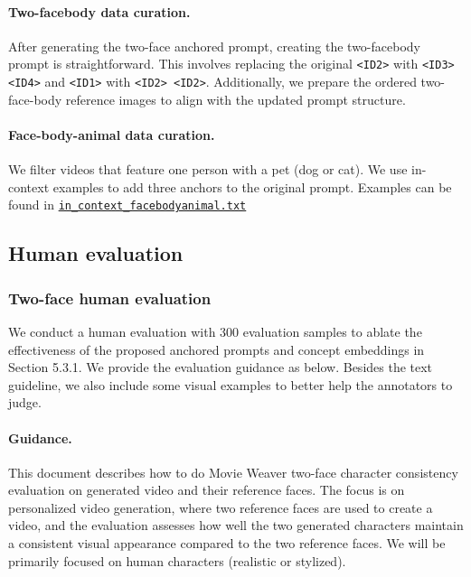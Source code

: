 \paragraph{Two-facebody data curation.}
After generating the two-face anchored prompt, creating the two-facebody prompt is straightforward. This involves replacing the original \texttt{\textless{}ID2\textgreater{}} with \texttt{\textless{}ID3\textgreater{} \textless{}ID4\textgreater{}} and \texttt{\textless{}ID1\textgreater{}} with \texttt{\textless{}ID2\textgreater{} \textless{}ID2\textgreater{}}. Additionally, we prepare the ordered two-face-body reference images to align with the updated prompt structure.

\paragraph{Face-body-animal data curation.}
We filter videos that feature one person with a pet (dog or cat). We use in-context examples to add three anchors to the original prompt. Examples can be found in \href{https://jeff-liangf.github.io/projects/movieweaver/supp/in_context_facebodyanimal.txt}{\texttt{in\_context\_facebodyanimal.txt}}



\subsection{Human evaluation}


\subsubsection{Two-face human evaluation}
\label{appendix:two_face_human_eval}

We conduct a human evaluation with 300 evaluation samples to ablate the effectiveness of the proposed anchored prompts and concept embeddings in Section 5.3.1. We provide the evaluation guidance as below. Besides the text guideline, we also include some visual examples to better help the annotators to judge.

\paragraph{Guidance.} This document describes how to do Movie Weaver two-face character consistency evaluation on generated video and their reference faces. 
The focus is on personalized video generation, where two reference faces are used to create a video, and the evaluation assesses how well the two generated characters maintain a consistent visual appearance compared to the two reference faces. We will be primarily focused on human characters (realistic or stylized).

